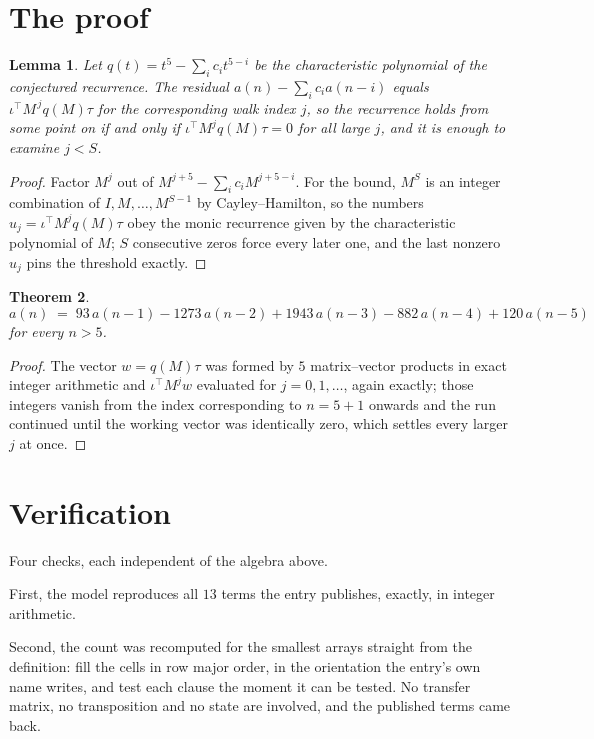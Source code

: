 \documentclass[11pt,a4paper]{article}
\theoremstyle{plain}
\newtheorem{theorem}{Theorem}
\newtheorem{lemma}[theorem]{Lemma}
\theoremstyle{definition}
\begin{document}
\section{The proof}

\begin{lemma}\label{lem:crit}
Let $q(t)=t^{5}-\sum_i c_it^{5-i}$ be the characteristic polynomial of the
conjectured recurrence. The residual $a(n)-\sum_ic_ia(n-i)$ equals
$\iota^{\!\top}M^{\,j}q(M)\tau$ for the corresponding walk index $j$, so the recurrence
holds from some point on if and only if $\iota^{\!\top}M^{j}q(M)\tau=0$ for all large $j$,
and it is enough to examine $j<S$.
\end{lemma}

\begin{proof}
Factor $M^{j}$ out of $M^{j+5}-\sum_ic_iM^{j+5-i}$. For the bound, $M^{S}$
is an integer combination of $I,M,\dots,M^{S-1}$ by Cayley--Hamilton, so the numbers
$u_j=\iota^{\!\top}M^{j}q(M)\tau$ obey the monic recurrence given by the characteristic
polynomial of $M$; $S$ consecutive zeros force every later one, and the last nonzero $u_j$
pins the threshold exactly.
\end{proof}

\begin{theorem}
\[
a(n)\;=\;93\,a(n-1) - 1273\,a(n-2) + 1943\,a(n-3) - 882\,a(n-4) + 120\,a(n-5)
\]
for every $n>5$.
\end{theorem}

\begin{proof}
The vector $w=q(M)\tau$ was formed by $5$ matrix--vector products in exact integer
arithmetic and $\iota^{\!\top}M^{j}w$ evaluated for $j=0,1,\dots$, again exactly; those
integers vanish from the index corresponding to $n=5+1$ onwards and the run continued
until the working vector was identically zero, which settles every larger $j$ at once.
\end{proof}

\section{Verification}

Four checks, each independent of the algebra above.

First, the model reproduces all $13$ terms the entry publishes, exactly, in integer
arithmetic.

Second, the count was recomputed for the smallest arrays straight from the definition: fill the
cells in row major order, in the orientation the entry's own name writes, and test each clause
the moment it can be tested. No transfer matrix, no transposition and no state are involved,
and the published terms came back.
\end{document}
